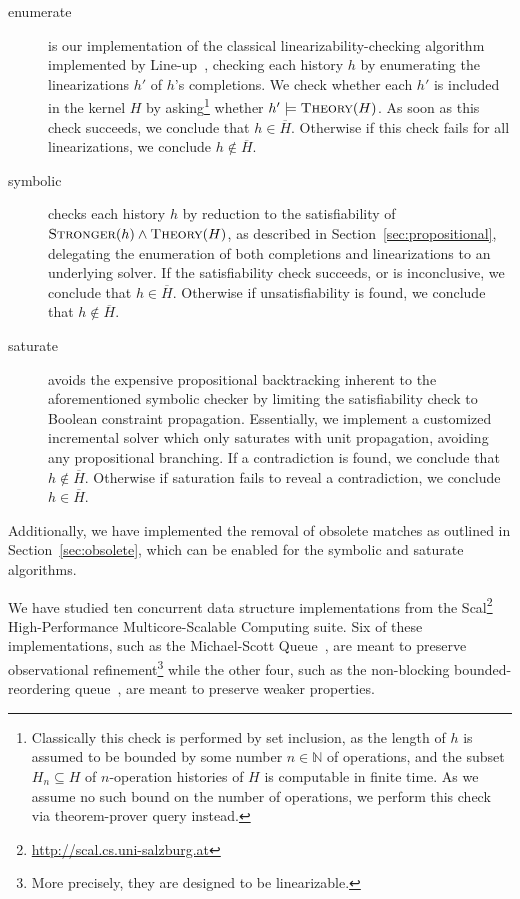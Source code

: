\begin{description}

  \item[{\sc enumerate}] is our implementation of the classical
  linearizability-checking algorithm~\cite{journals/jpdc/WingG93} implemented
  by Line-up~\cite{conf/pldi/BurckhardtDMT10}, checking each history $h$ by
  enumerating the linearizations $h'$ of $h$'s completions. We check whether
  each $h'$ is included in the kernel $H$ by asking\footnote{Classically this
  check is performed by set inclusion, as the length of $h$ is assumed to be
  bounded by some number $n \in \mathbb{N}$ of operations, and the subset $H_n
  \subseteq H$ of $n$-operation histories of $H$ is computable in finite time.
  As we assume no such bound on the number of operations, we perform this check
  via theorem-prover query instead.} whether $h' \models \textsc{Theory}(H)$.
  As soon as this check succeeds, we conclude that $h \in \overline{H}$.
  Otherwise if this check fails for all linearizations, we conclude $h
  \not\in \overline{H}$.

  \item[{\sc symbolic}] checks each history $h$ by reduction to the
  satisfiability of $\textsc{Stronger}(h) \land \textsc{Theory}(H)$, as
  described in Section~\ref{sec:propositional}, delegating the enumeration of
  both completions and linearizations to an underlying solver. If the
  satisfiability check succeeds, or is inconclusive, we conclude that $h \in
  \overline{H}$. Otherwise if unsatisfiability is found, we conclude that $h
  \not\in \overline{H}$.

  \item[{\sc saturate}] avoids the expensive propositional backtracking
  inherent to the aforementioned {\sc symbolic} checker by limiting the
  satisfiability check to Boolean constraint propagation. Essentially, we
  implement a customized incremental solver which only saturates with unit
  propagation, avoiding any propositional branching. If a contradiction is
  found, we conclude that $h \not\in \overline{H}$. Otherwise if saturation
  fails to reveal a contradiction, we conclude $h \in \overline{H}$.

\end{description}
Additionally, we have implemented the removal of obsolete matches as outlined
in Section~\ref{sec:obsolete}, which can be enabled for the {\sc symbolic}
and {\sc saturate} algorithms.

We have studied ten concurrent data structure implementations from the
Scal\footnote{\url{http://scal.cs.uni-salzburg.at}} High-Performance
Multicore-Scalable Computing suite. Six of these implementations, such as the
Michael-Scott Queue~\cite{conf/podc/MichaelS96}, are meant to preserve
observational refinement\footnote{More precisely, they are designed to be
linearizable.} while the other four, such as the non-blocking
bounded-reordering queue~\cite{conf/pact/KirschLP13}, are meant to preserve
weaker properties.

